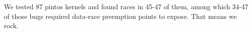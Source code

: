 We tested 87 pintos kernels and found races in 45-47 of them, among which 34-47 of those bugs required data-race preemption points to expose. That means we rock.

